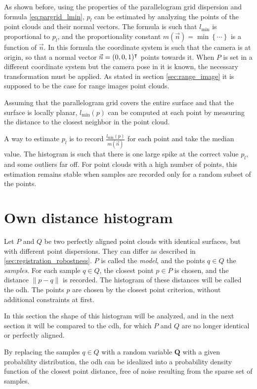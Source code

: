 As shown before, using the properties of the parallelogram grid dispersion and formula \ref{eq:pargrid_lmin}, $p_l$ can be estimated by analyzing the points of the point clouds and their normal vectors. The formula is such that $l_{\text{min}}$ is proportional to $p_l$, and the proportionality constant $m(\vec{n}) = \min \left\{ \cdots \right\}$ is a function of $\vec{n}$. In this formula the coordinate system is such that the camera is at origin, so that a normal vector $\vec{n} = (0, 0, 1)^\intercal$ points towards it. When $P$ is set in a different coordinate system but the camera pose in it is known, the necessary transformation must be applied. As stated in section \ref{sec:range_image} it is supposed to be the case for range images point clouds.

Assuming that the parallelogram grid covers the entire surface and that the surface is locally planar, $l_{\text{min}}(p)$ can be computed at each point by measuring the distance to the closest neighbor in the point cloud.

A way to estimate $p_l$ is to record $\frac{l_{\text{min}}(p)}{m(\vec{n})}$ for each point and take the median value. The histogram is such that there is one large spike at the correct value $p_l$, and some outliers far off. For point clouds with a high number of points, this estimation remains stable when samples are recorded only for a random subset of the points.


\newpage

\section{Own distance histogram}
Let $P$ and $Q$ be two perfectly aligned point clouds with identical surfaces, but with different point dispersions. They can differ as described in \ref{sec:registration_robostness}. $P$ is called the \emph{model}, and the points $q \in Q$ the \emph{samples}. For each sample $q \in Q$, the closest point $p \in P$ is chosen, and the distance $\|p - q\|$ is recorded. The histogram of these distances will be called the \gls{odh}. The points $p$ are chosen by the closest point criterion, without additional constraints at first.

In this section the shape of this histogram will be analyzed, and in the next section it will be compared to the \acrfull{cdh}, for which $P$ and $Q$ are no longer identical or perfectly aligned.

By replacing the samples $q \in Q$ with a random variable $\textbf{Q}$ with a given probability distribution, the \gls{odh} can be idealized into a probability density function of the closest point distance, free of noise resulting from the sparse set of samples.

